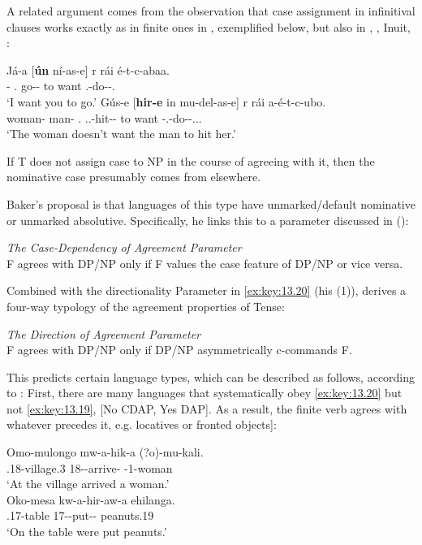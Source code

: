 \documentclass[output=paper]{langsci/langscibook}
\begin{document}
A related argument comes from the observation that case assignment in
infinitival clauses works exactly as in finite ones in ,
exemplified below, but also in , , 
Inuit, :

\ea%
    \label{ex:key:13.18} \parencite[44]{Baker2015}
	\ea
	\gll   Já-a  [\textbf{ún}  ní-as-e]                r rái é-t-c-abaa.\\
	    \Fsg-\Erg{} \Ssg.\Abs{}  go-\Inf{}-\Obl{}  to want \Tsg.\Obj{}-do-\Npst-\Fsg{}.\Prs{}\\
	\glt     ‘I want you to go.’
	\ex
	\gll  Gús-e  [\textbf{hir-e}  in mu-del-as-e]                                     r rái a-é-t-c-ubo.\\
	    woman-\Erg{}  man-\Erg{}  \Tsg{}.\Abs{} \Third.\glossF{}.\Obj{}-hit-\Inf{}-\Obl{}  to want \Neg{}-\Tsg.\Obj{}-do-\Npst{}-\Third.\glossF.\Sbj{}.\Prs{}\\
	\glt     ‘The woman doesn’t want the man to hit her.’
    \z
\z

If T does not assign case to NP in the course of agreeing with it, then the
nominative case presumably comes from elsewhere.

Baker’s proposal is that languages of this type have unmarked/default
nominative or unmarked absolutive. Specifically, he links this to a parameter
discussed in \citeauthor{Baker2008} (\citeyear[155, (2)]{Baker2008}):

\ea%
    \label{ex:key:13.19}
    \emph{The Case-Dependency of Agreement Parameter}\\
    F agrees with DP/NP only if F values the case feature of DP/NP or vice
    versa.
\z

Combined with the directionality Parameter in \eqref{ex:key:13.20} (his (1)),
\citet{Baker2008} derives a four-way typology of the agreement properties of
Tense:

\ea\label{ex:key:13.20}
    \emph{The Direction of Agreement Parameter}\\
    F agrees with DP/NP only if DP/NP asymmetrically c-commands F.
\z

This predicts certain language types, which can be described as follows,
according to \citet{Baker2008}: First, there are many  languages that
systematically obey \eqref{ex:key:13.20} but not \eqref{ex:key:13.19}, [No CDAP, Yes
DAP]. As a result, the finite verb agrees with whatever precedes it, e.g.
locatives or fronted objects]:\newpage

\ea%
    \label{ex:key:13.21} \citep[158]{Baker2008}
	\ea
	\gll  Omo-mulongo mw-a-hik-a (?o)-mu-kali.\\
    \Loc.18-village.3 18\Sm-\Tns-arrive-\Fv{} \Aug{}-1-woman\\
	\glt     ‘At the village arrived a woman.’\\
    \ex
    \gll Oko-mesa kw-a-hir-aw-a ehilanga.\\
    \Loc.17-table 17\Sm-\Tns-put-\Pass{}-\Fv{} peanuts.19\\
    \glt ‘On the table were put peanuts.’
    \z
\z
\end{document}

